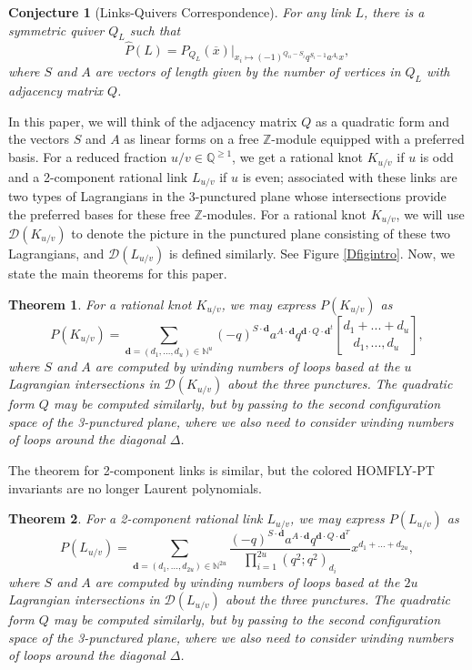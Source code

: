 \documentclass[11pt]{amsart}
\theoremstyle{plain}
\newtheorem{theorem}{Theorem}
\newtheorem{conjecture}{Conjecture}
\theoremstyle{definition}
\theoremstyle{remark}
\begin{document}
\begin{conjecture}[Links-Quivers Correspondence]
\label{LQC1intro}
    For any link $L$, there is a symmetric quiver $Q_L$ such that 
   \[
   \widehat{P}(L)=P_{Q_L}(\overline{x})\bigg|_{x_i\mapsto (-1)^{Q_{ii}-S_i}q^{S_i-1}a^{A_i}x},
   \]
   where $S$ and $A$ are vectors of length given by the number of vertices in $Q_L$ with adjacency matrix $Q$.
\end{conjecture}

In this paper, we will think of the adjacency matrix $Q$ as a quadratic form and the vectors $S$ and $A$ as linear forms on a free $\mathbb{Z}$-module equipped with a preferred basis. For a reduced fraction $u/v\in\mathbb{Q}^{\geq 1}$, we get a rational knot $K_{u/v}$ if $u$ is odd and a 2-component rational link $L_{u/v}$ if $u$ is even; associated with these links are two types of Lagrangians in the 3-punctured plane whose intersections provide the preferred bases for these free $\mathbb{Z}$-modules. For a rational knot $K_{u/v}$, we will use $\mathcal{D}(K_{u/v})$ to denote the picture in the punctured plane consisting of these two Lagrangians, and $\mathcal{D}(L_{u/v})$ is defined similarly. See Figure \ref{Dfigintro}. Now, we state the main theorems for this paper.

\begin{theorem}
\label{knotthmintro}
    For a rational knot $K_{u/v}$, we may express $P(K_{u/v})$ as 
    \begin{equation}
    \label{PKuv}
        P(K_{u/v})=\sum_{\textbf{d}=(d_1,...,d_u)\in \mathbb{N}^u}(-q)^{S\cdot \textbf{d}}a^{A\cdot \textbf{d}}q^{\textbf{d} \cdot Q\cdot \textbf{d}^t} {d_1+...+d_u\brack d_1,...,d_u},
    \end{equation}
    where $S$ and $A$ are computed by winding numbers of loops based at the $u$ Lagrangian intersections in $\mathcal{D}(K_{u/v})$ about the three punctures. The quadratic form $Q$ may be computed similarly, but by passing to the second configuration space of the 3-punctured plane, where we also need to consider winding numbers of loops around the diagonal $\Delta$.
\end{theorem}

The theorem for 2-component links is similar, but the colored HOMFLY-PT invariants are no longer Laurent polynomials.

\begin{theorem}
\label{linkthmintro}
    For a 2-component rational link $L_{u/v}$, we may express $P(L_{u/v})$ as 
    \begin{equation}
    \label{PLuv}
   P(L_{u/v})=\sum_{\textbf{d}=(d_1,...,d_{2u})\in \mathbb{N}^{2u}} \frac{(-q)^{S\cdot \textbf{d}}a^{A\cdot \textbf{d}}q^{\textbf{d}\cdot Q \cdot\textbf{d}^T}}{\prod_{i=1}^{2u}(q^2;q^2)_{d_i}}x^{d_1+...+d_{2u}},
\end{equation}
    where $S$ and $A$ are computed by winding numbers of loops based at the $2u$ Lagrangian intersections in $\mathcal{D}(L_{u/v})$ about the three punctures. The quadratic form $Q$ may be computed similarly, but by passing to the second configuration space of the 3-punctured plane, where we also need to consider winding numbers of loops around the diagonal $\Delta$.
\end{theorem}
\end{document}

